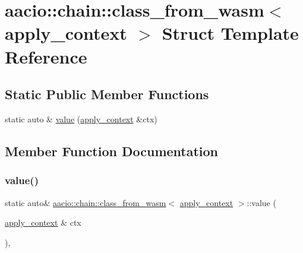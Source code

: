 \hypertarget{structaacio_1_1chain_1_1class__from__wasm_3_01apply__context_01_4}{}\section{aacio\+:\+:chain\+:\+:class\+\_\+from\+\_\+wasm$<$ apply\+\_\+context $>$ Struct Template Reference}
\label{structaacio_1_1chain_1_1class__from__wasm_3_01apply__context_01_4}
\subsection*{Static Public Member Functions}
\begin{DoxyCompactItemize}
\item 
static auto \& \mbox{\hyperlink{structaacio_1_1chain_1_1class__from__wasm_3_01apply__context_01_4_a2dfe9c7020b3d583b5299e3a62a440bb}{value}} (\mbox{\hyperlink{classaacio_1_1chain_1_1apply__context}{apply\+\_\+context}} \&ctx)
\end{DoxyCompactItemize}


\subsection{Member Function Documentation}
\mbox{\label{structaacio_1_1chain_1_1class__from__wasm_3_01apply__context_01_4_a2dfe9c7020b3d583b5299e3a62a440bb}} 
\subsubsection{\texorpdfstring{value()}{value()}}
{\footnotesize\ttfamily static auto\& \mbox{\hyperlink{structaacio_1_1chain_1_1class__from__wasm}{aacio\+::chain\+::class\+\_\+from\+\_\+wasm}}$<$ \mbox{\hyperlink{classaacio_1_1chain_1_1apply__context}{apply\+\_\+context}} $>$\+::value (\begin{DoxyParamCaption}\item[{\mbox{\hyperlink{classaacio_1_1chain_1_1apply__context}{apply\+\_\+context}} \&}]{ctx }\end{DoxyParamCaption})\hspace{0.3cm}{\ttfamily [inline]}, {\ttfamily [static]}}

